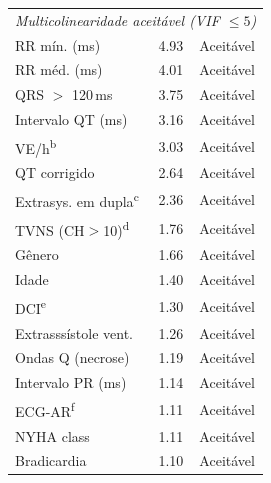 \begin{table}[htbp]
{\begin{tabular}{lcc}
			\midrule
			\multicolumn{3}{l}{\textit{Multicolinearidade aceit\'avel (VIF $\leq 5$)}}                       \\
			\addlinespace
			RR m\'in. (ms)                        & 4.93  & Aceit\'avel                                      \\
			RR m\'ed. (ms)                        & 4.01  & Aceit\'avel                                      \\
			QRS $>$ 120\,ms                       & 3.75  & Aceit\'avel                                      \\
			Intervalo QT (ms)                     & 3.16  & Aceit\'avel                                      \\
			VE/h\textsuperscript{b}               & 3.03  & Aceit\'avel                                      \\
			QT corrigido                          & 2.64  & Aceit\'avel                                      \\
			Extrasys. em dupla\textsuperscript{c} & 2.36  & Aceit\'avel                                      \\
			TVNS (CH$>$10)\textsuperscript{d}     & 1.76  & Aceit\'avel                                      \\
			G\^enero                              & 1.66  & Aceit\'avel                                      \\
			Idade                                 & 1.40  & Aceit\'avel                                      \\
			DCI\textsuperscript{e}                & 1.30  & Aceit\'avel                                      \\
			Extrasss\'istole vent.                & 1.26  & Aceit\'avel                                      \\
			Ondas Q (necrose)                     & 1.19  & Aceit\'avel                                      \\
			Intervalo PR (ms)                     & 1.14  & Aceit\'avel                                      \\
			ECG-AR\textsuperscript{f}             & 1.11  & Aceit\'avel                                      \\
			NYHA class                            & 1.11  & Aceit\'avel                                      \\
			Bradicardia                           & 1.10  & Aceit\'avel                                      \\

\end{tabular}}
\end{table}
